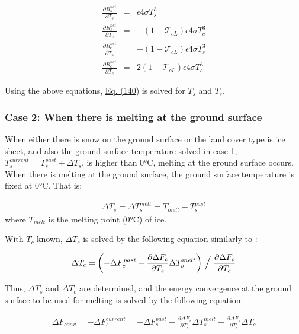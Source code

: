 \begin{eqnarray}
 \frac{\partial R^{net}_s}{\partial T_s} &=&
 \epsilon 4 \sigma T_s^3 \\
 \frac{\partial R^{net}_s}{\partial T_c} &=&
 - ( 1 - {\mathcal{T}}_{cL} ) \epsilon 4 \sigma T_c^3 \\
 \frac{\partial R^{net}_c}{\partial T_s} &=&
 - ( 1 - {\mathcal{T}}_{cL} ) \epsilon 4 \sigma T_s^3 \\
 \frac{\partial R^{net}_c}{\partial T_c} &=&
  2( 1 - {\mathcal{T}}_{cL} ) \epsilon 4 \sigma T_c^3
\end{eqnarray}

Using the above equations, \href{$eq140}{Eq. (140)} is solved for \(T_s\) and \(T_c\).

\subsubsection{Case 2: When there is melting at the ground surface}\label{case-2-when-there-is-melting-at-the-ground-surface}

When either there is snow on the ground surface or the land cover type is ice sheet, and also the ground surface temperature solved in case 1, \(T_s^{current} = T_s^{past}+\Delta T_s\), is higher than
0°C, melting at the ground surface occurs. When there is melting at the ground surface, the ground surface temperature is fixed at 0°C. That is:

\begin{eqnarray}
 \Delta T_s = \Delta T_s^{melt} = T_{melt} - T_s^{past}
\end{eqnarray} where \(T_{melt}\) is the melting point (0°C) of ice.

With \(T_c\) known, \(\Delta T_s\) is solved by the following equation similarly to \hyperref[eq140]{}:

\begin{eqnarray}
 \Delta T_c = \left( - \Delta F_c^{past}
            - \frac{\partial \Delta F_c}{\partial T_s} \Delta T_s^{melt}
              \right) \Bigm/ \frac{\partial \Delta F_c}{\partial T_c}
\end{eqnarray}

Thus, \(\Delta T_s\) and \(\Delta T_c\) are determined, and the energy convergence at the ground surface to be used for melting is solved by the following equation:

\begin{eqnarray}
 \Delta F_{conv} =
 - \Delta F_s^{current} = - \Delta F_s^{past}
 - \frac{\partial \Delta F_s}{\partial T_s} \Delta T_s^{melt}
 - \frac{\partial \Delta F_s}{\partial T_c} \Delta T_c
\end{eqnarray}

